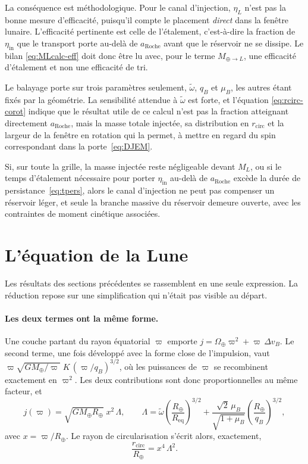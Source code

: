 \documentclass[11pt,a4paper,openany]{report}
\newcommand{\Mt}{M_{\oplus}}
\newcommand{\Rt}{R_{\oplus}}
\newcommand{\Req}{R_{\mathrm{eq}}}
\newcommand{\aR}{a_{\mathrm{Roche}}}
\begin{document}
La conséquence est méthodologique. Pour le canal d'injection, $\eta_L$ n'est pas la bonne mesure
d'efficacité, puisqu'il compte le placement \emph{direct} dans la fenêtre lunaire. L'efficacité
pertinente est celle de l'étalement, c'est-à-dire la fraction de $\eta_{\mathrm{in}}$ que le
transport porte au-delà de $\aR$ avant que le réservoir ne se dissipe. Le bilan
\eqref{eq:MLcalc-eff} doit donc être lu avec, pour le terme $M_{\oplus\to L}$, une efficacité
d'étalement et non une efficacité de tri.

\begin{controle}
Le balayage porte sur trois paramètres seulement, $\tilde\omega$, $q_B$ et $\mu_B$, les autres étant
fixés par la géométrie. La sensibilité attendue à $\tilde\omega$ est forte, et l'équation
\eqref{eq:rcirc-corot} indique que le résultat utile de ce calcul n'est pas la fraction atteignant
directement $\aR$, mais la masse totale injectée, sa distribution en $r_{\mathrm{circ}}$ et la
largeur de la fenêtre en rotation qui la permet, à mettre en regard du spin correspondant dans la
porte~\eqref{eq:DJEM}.
\end{controle}

\begin{falsif}
Si, sur toute la grille, la masse injectée reste négligeable devant $M_L$, ou si le temps
d'étalement nécessaire pour porter $\eta_{\mathrm{in}}$ au-delà de $\aR$ excède la durée de
persistance~\eqref{eq:tpers}, alors le canal d'injection ne peut pas compenser un réservoir léger,
et seule la branche massive du réservoir demeure ouverte, avec les contraintes de moment cinétique
associées.
\end{falsif}


\section{L'équation de la Lune}
\label{sec:equation-lune}

Les résultats des sections précédentes se rassemblent en une seule expression. La réduction repose
sur une simplification qui n'était pas visible au départ.

\paragraph{Les deux termes ont la même forme.} Une couche partant du rayon équatorial $\varpi$
emporte $j=\Omega_\oplus\varpi^2+\varpi\,\Delta v_B$. Le second terme, une fois développé avec la
forme close de l'impulsion, vaut
$\varpi\sqrt{G\Mt/\varpi}\;K\,(\varpi/q_B)^{3/2}$, où les puissances de $\varpi$ se recombinent
exactement en $\varpi^{2}$. Les deux contributions sont donc proportionnelles au même facteur, et
\begin{equation}
j(\varpi)=\sqrt{G\Mt\Rt}\;x^{2}\,\Lambda,
\qquad
\Lambda=\tilde\omega\left(\frac{\Rt}{\Req}\right)^{3/2}
+\frac{\sqrt2\,\mu_B}{\sqrt{1+\mu_B}}\left(\frac{\Rt}{q_B}\right)^{3/2},
\label{eq:Lambda}
\end{equation}
avec $x=\varpi/\Rt$. Le rayon de circularisation s'écrit alors, exactement,
\begin{equation}
\frac{r_{\mathrm{circ}}}{\Rt}=x^{4}\,\Lambda^{2}.
\label{eq:rcirc-close}
\end{equation}
\end{document}
